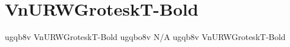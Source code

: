\documentclass[sample]{vnsample}
\begin{document}
\section{VnURWGroteskT-Bold}
    {ugqb8v}   {VnURWGroteskT-Bold}
   {ugqbo8v}  {N/A}
    {ugqb8v}   {VnURWGroteskT-Bold}
\end{document}
